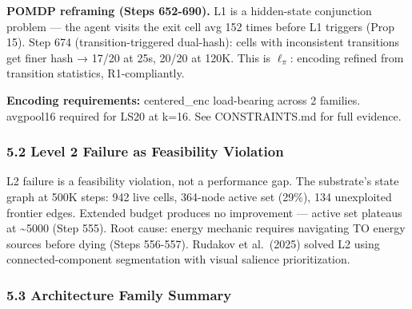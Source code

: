 \documentclass[
  11pt,
]{article}
\begin{document}
\textbf{POMDP reframing (Steps 652-690).} L1 is a hidden-state
conjunction problem --- the agent visits the exit cell avg 152 times
before L1 triggers (Prop 15). Step 674 (transition-triggered dual-hash):
cells with inconsistent transitions get finer hash → 17/20 at 25s, 20/20
at 120K. This is \(\ell_\pi\): encoding refined from transition
statistics, R1-compliantly.

\textbf{Encoding requirements:} centered\_enc load-bearing across 2
families. avgpool16 required for LS20 at k=16. See CONSTRAINTS.md for
full evidence.

\subsubsection{5.2 Level 2 Failure as Feasibility
Violation}\label{level-2-failure-as-feasibility-violation}

L2 failure is a feasibility violation, not a performance gap. The
substrate's state graph at 500K steps: 942 live cells, 364-node active
set (29\%), 134 unexploited frontier edges. Extended budget produces no
improvement --- active set plateaus at \textasciitilde5000 (Step 555).
Root cause: energy mechanic requires navigating TO energy sources before
dying (Steps 556-557). Rudakov et al.~(2025) solved L2 using
connected-component segmentation with visual salience prioritization.

\subsubsection{5.3 Architecture Family
Summary}\label{architecture-family-summary}
\end{document}
